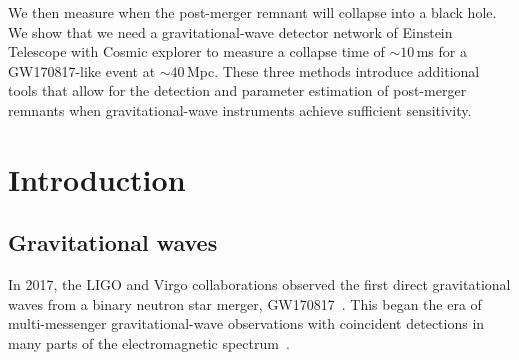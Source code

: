 \documentclass[../Thesis.tex]{subfiles}
\begin{document}
    We  then measure when the post-merger remnant will collapse into a black hole.
    We show that we need a gravitational-wave detector network of Einstein Telescope with Cosmic explorer to measure a collapse time of $\sim\!10$\,ms for a GW170817-like event at $\sim\!40$\,Mpc.
    These three methods introduce additional tools that allow for the detection and parameter estimation of post-merger remnants when gravitational-wave instruments achieve sufficient sensitivity.
    
    
\begingroup
\clearpage%
\let\clearpage\relax%
\vspace*{-2cm}%



\chapter{Introduction} \label{chapter:Introduction}
\endgroup 

    \section{Gravitational waves} 
    In 2017, the LIGO and Virgo collaborations observed the first direct gravitational waves from a binary neutron star merger, GW170817~\cite{GW170817Detection}.
    This began the era of multi-messenger gravitational-wave observations with coincident detections in many parts of the electromagnetic spectrum~\cite{Goldstein2017,Coulter2017,Troja2017,Nicholl2017,Chornock2017,Margutti2017,Alexander2017,GW170817multi}. \par
    
\end{document}
